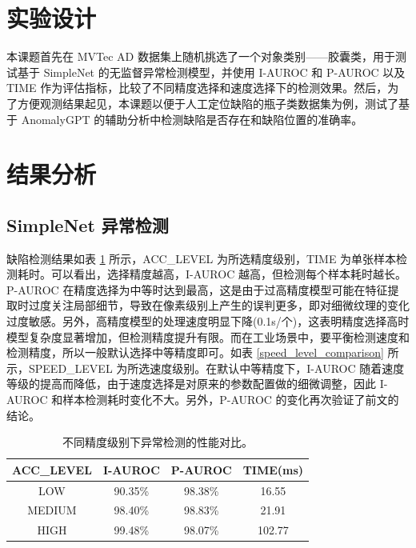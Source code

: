 \documentclass[
  ]{njuthesis}
\begin{document}
\section{实验设计}

本课题首先在 MVTec AD 数据集上随机挑选了一个对象类别——胶囊类，用于测试基于 SimpleNet 的无监督异常检测模型，并使用 I-AUROC 和 P-AUROC 以及 TIME 作为评估指标，比较了不同精度选择和速度选择下的检测效果。然后，为了方便观测结果起见，本课题以便于人工定位缺陷的瓶子类数据集为例，测试了基于 AnomalyGPT 的辅助分析中检测缺陷是否存在和缺陷位置的准确率。

\section{结果分析}

\subsection{SimpleNet 异常检测}

缺陷检测结果如表 \ref{acc_level_comparison} 所示，ACC\_LEVEL 为所选精度级别，TIME 为单张样本检测耗时。可以看出，选择精度越高，I-AUROC 越高，但检测每个样本耗时越长。P-AUROC 在精度选择为中等时达到最高，这是由于过高精度模型可能在特征提取时过度关注局部细节，导致在像素级别上产生的误判更多，即对细微纹理的变化过度敏感。另外，高精度模型的处理速度明显下降(0.1s/个)，这表明精度选择高时模型复杂度显著增加，但检测精度提升有限。而在工业场景中，要平衡检测速度和检测精度，所以一般默认选择中等精度即可。如表 \ref{speed_level_comparison} 所示，SPEED\_LEVEL 为所选速度级别。在默认中等精度下，I-AUROC 随着速度等级的提高而降低，由于速度选择是对原来的参数配置做的细微调整，因此 I-AUROC 和样本检测耗时变化不大。另外，P-AUROC 的变化再次验证了前文的结论。

\begin{table}[H]
    \centering
    \caption{不同精度级别下异常检测的性能对比。}
    \label{acc_level_comparison}
    \renewcommand\arraystretch{0.8}
    \begin{tabular}{cccc}
    \toprule
    ACC\_LEVEL & I-AUROC & P-AUROC & TIME(ms) \\
    \midrule
    LOW & 90.35\% & 98.38\% & 16.55 \\
    MEDIUM & 98.40\% & 98.83\% & 21.91 \\
    HIGH & 99.48\% & 98.07\% & 102.77 \\
    \bottomrule
    \end{tabular}
\end{table}
\end{document}
